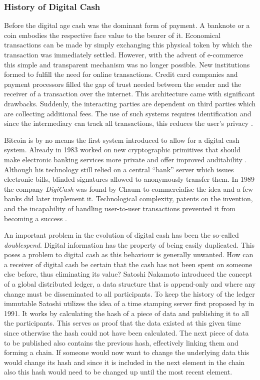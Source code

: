 \documentclass[final]{fhnwreport}       %
\begin{document}
\subsubsection{History of Digital Cash}
Before the digital age cash was the dominant form of payment. A banknote or a coin embodies the respective face value to the bearer of it. Economical transactions can be made by simply exchanging this physical token by which the transaction was immediately settled. However, with the advent of e-commerce this simple and transparent mechanism was no longer possible. New institutions formed to fulfill the need for online transactions. Credit card companies and payment processors filled the gap of trust needed between the sender and the receiver of a transaction over the internet. This architecture came with significant drawbacks. Suddenly, the interacting parties are dependent on third parties which are collecting additional fees. The use of such systems requires identification and since the intermediary can track all transactions, this reduces the user's privacy \citep{narayanan_bitcoin_2016}.

Bitcoin is by no means the first system introduced to allow for a digital cash system. Already in 1983 \citeauthor{chaum_blind_1983} worked on new cryptographic primitives that should make electronic banking services more private and offer improved auditability \citep{chaum_blind_1983}. Although his technology still relied on a central ``bank'' server which issues electronic bills, blinded signatures allowed to anonymously transfer them. In 1989 the company \emph{DigiCash} was found by Chaum to commercialise the idea and a few banks did later implement it. Technological complexity, patents on the invention, and the incapability of handling user-to-user transactions prevented it from becoming a success \citep{narayanan_bitcoin_2016}. 

An important problem in the evolution of digital cash has been the so-called \emph{\gls{doublespend}}. Digital information has the property of being easily duplicated. This poses a problem to digital cash as this behaviour is generally unwanted. How can a receiver of digital cash be certain that the cash has not been spent on someone else before, thus eliminating its value? Satoshi Nakamoto introduced the concept of a global distributed ledger, a data structure that is append-only and where any change must be disseminated to all participants. To keep the history of the ledger immutable Satoshi utilizes the idea of a time stamping server first proposed by \textcite{haber_how_1991} in 1991. It works by calculating the \gls{hash} of a piece of data and publishing it to all the participants. This serves as proof that the data existed at this given time since otherwise the \gls{hash} could not have been calculated. The next piece of data to be published also contains the previous \gls{hash}, effectively linking them and forming a chain. If someone would now want to change the underlying data this would change its \gls{hash} and since it is included in the next element in the chain also this \gls{hash} would need to be changed up until the most recent element. 
\end{document}
